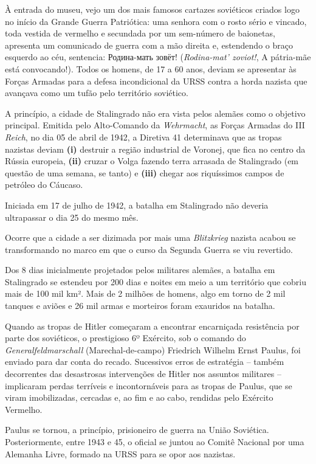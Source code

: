 À entrada do museu, vejo um dos mais famosos cartazes soviéticos criados
logo no início da Grande Guerra Patriótica: uma senhora com o rosto
sério e vincado, toda vestida de vermelho e secundada por um sem-número
de baionetas, apresenta um comunicado de guerra com a mão direita e,
estendendo o braço esquerdo ao céu, sentencia: Родина-мать зовёт!
(\emph{Rodina-mat' zoviot!}, A pátria-mãe está convocando!). Todos os
homens, de 17 a 60 anos, deviam se apresentar às Forças Armadas para a
defesa incondicional da URSS contra a horda nazista que avançava como um
tufão pelo território soviético.

A princípio, a cidade de Stalingrado não era vista pelos alemães como o
objetivo principal. Emitida pelo Alto-Comando da \emph{Wehrmacht}, as
Forças Armadas do III \emph{Reich}, no dia 05 de abril de 1942, a
Diretiva 41 determinava que as tropas nazistas deviam \textbf{(i)}
destruir a região industrial de Voronej, que fica no centro da Rússia
europeia, \textbf{(ii)} cruzar o Volga fazendo terra arrasada de
Stalingrado (em questão de uma semana, se tanto) e \textbf{(iii)} chegar
aos riquíssimos campos de petróleo do Cáucaso.

Iniciada em 17 de julho de 1942, a batalha em Stalingrado não deveria
ultrapassar o dia 25 do mesmo mês.

Ocorre que a cidade a ser dizimada por mais uma \emph{Blitzkrieg}
nazista acabou se transformando no marco em que o curso da Segunda
Guerra se viu revertido.

Dos 8 dias inicialmente projetados pelos militares alemães, a batalha em
Stalingrado se estendeu por 200 dias e noites em meio a um território
que cobriu mais de 100 mil km². Mais de 2 milhões de homens, algo em
torno de 2 mil tanques e aviões e 26 mil armas e morteiros foram
exauridos na batalha.

Quando as tropas de Hitler começaram a encontrar encarniçada resistência
por parte dos soviéticos, o prestigioso 6º Exército, sob o comando do
\emph{Generalfeldmarschall} (Marechal-de-campo) Friedrich Wilhelm Ernst
Paulus, foi enviado para dar conta do recado. Sucessivos erros de
estratégia -- também decorrentes das desastrosas intervenções de Hitler
nos assuntos militares -- implicaram perdas terríveis e incontornáveis
para as tropas de Paulus, que se viram imobilizadas, cercadas e, ao fim
e ao cabo, rendidas pelo Exército Vermelho.

Paulus se tornou, a princípio, prisioneiro de guerra na União Soviética.
Posteriormente, entre 1943 e 45, o oficial se juntou ao Comitê Nacional
por uma Alemanha Livre, formado na URSS para se opor aos nazistas.

